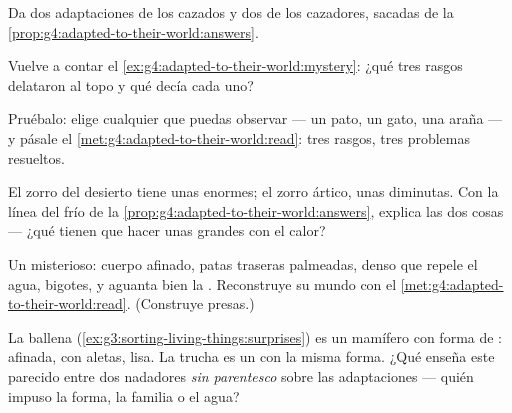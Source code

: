 \begin{exercise}[$\star$]\label{exo:g4:adapted-to-their-world:6}
Da dos adaptaciones de los  cazados y dos de los cazadores,
sacadas de la \cref{prop:g4:adapted-to-their-world:answers}.
\end{exercise}

\begin{exercise}[$\star$]\label{exo:g4:adapted-to-their-world:7}
Vuelve a contar el \cref{ex:g4:adapted-to-their-world:mystery}: ¿qué
tres rasgos delataron al topo y qué decía cada uno?
\end{exercise}

\begin{exercise}[$\star$]\label{exo:g4:adapted-to-their-world:8}
Pruébalo: elige cualquier  que puedas observar --- un pato, un
gato, una araña --- y pásale el
\cref{met:g4:adapted-to-their-world:read}: tres rasgos, tres problemas
resueltos.
\end{exercise}

\begin{exercise}[$\star\star$]\label{exo:g4:adapted-to-their-world:9}
El zorro del desierto tiene unas  enormes; el zorro ártico, unas
diminutas. Con la línea del frío de la
\cref{prop:g4:adapted-to-their-world:answers}, explica las dos cosas
--- ¿qué tienen que hacer unas  grandes con el calor?
\end{exercise}

\begin{exercise}[$\star\star$]\label{exo:g4:adapted-to-their-world:10}
Un  misterioso: cuerpo afinado, patas traseras palmeadas, 
denso que repele el agua, bigotes, y aguanta bien la .
Reconstruye su mundo con el
\cref{met:g4:adapted-to-their-world:read}. (Construye presas.)
\end{exercise}

\begin{exercise}[$\star\star\star$]\label{exo:g4:adapted-to-their-world:11}
La ballena (\cref{ex:g3:sorting-living-things:surprises}) es un
mamífero con forma de : afinada, con aletas, lisa. La trucha es un
 con la misma forma. ¿Qué enseña este parecido entre dos nadadores
\emph{sin parentesco} sobre las adaptaciones --- quién impuso la
forma, la familia o el agua?
\end{exercise}
